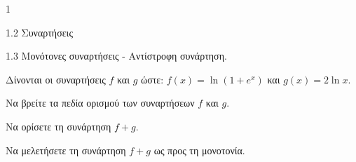 \begin{ylh}{1}
    \item 1.2 Συναρτήσεις
    \item 1.3 Μονότονες συναρτήσεις - Αντίστροφη συνάρτηση.
\end{ylh}
Δίνονται οι συναρτήσεις $f$ και $g$ ώστε:
$f(x) = \ln(1+e^x)$ και $g(x) = 2\ln x$.
\begin{alist}
\item Να βρείτε τα πεδία ορισμού των συναρτήσεων $f$ και $g$. 
\item Να ορίσετε τη συνάρτηση $f+g$. 
\item Να μελετήσετε τη συνάρτηση $f+g$ ως προς τη μονοτονία. 
\end{alist}